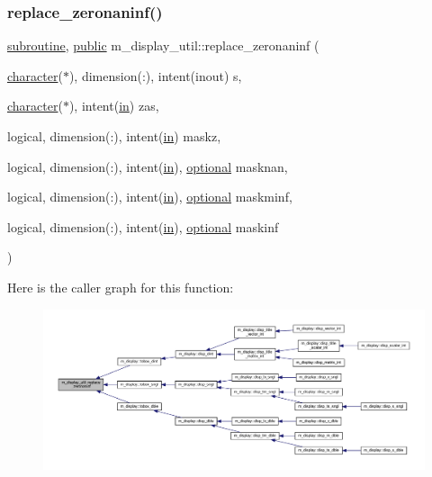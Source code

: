 \subsubsection{\texorpdfstring{replace\+\_\+zeronaninf()}{replace\_zeronaninf()}}
{\footnotesize\ttfamily \hyperlink{M__stopwatch_83_8txt_acfbcff50169d691ff02d4a123ed70482}{subroutine}, \hyperlink{M__stopwatch_83_8txt_a2f74811300c361e53b430611a7d1769f}{public} m\+\_\+display\+\_\+util\+::replace\+\_\+zeronaninf (\begin{DoxyParamCaption}\item[{\hyperlink{option__stopwatch_83_8txt_abd4b21fbbd175834027b5224bfe97e66}{character}($\ast$), dimension(\+:), intent(inout)}]{s,  }\item[{\hyperlink{option__stopwatch_83_8txt_abd4b21fbbd175834027b5224bfe97e66}{character}($\ast$), intent(\hyperlink{M__journal_83_8txt_afce72651d1eed785a2132bee863b2f38}{in})}]{zas,  }\item[{logical, dimension(\+:), intent(\hyperlink{M__journal_83_8txt_afce72651d1eed785a2132bee863b2f38}{in})}]{maskz,  }\item[{logical, dimension(\+:), intent(\hyperlink{M__journal_83_8txt_afce72651d1eed785a2132bee863b2f38}{in}), \hyperlink{option__stopwatch_83_8txt_aa4ece75e7acf58a4843f70fe18c3ade5}{optional}}]{masknan,  }\item[{logical, dimension(\+:), intent(\hyperlink{M__journal_83_8txt_afce72651d1eed785a2132bee863b2f38}{in}), \hyperlink{option__stopwatch_83_8txt_aa4ece75e7acf58a4843f70fe18c3ade5}{optional}}]{maskminf,  }\item[{logical, dimension(\+:), intent(\hyperlink{M__journal_83_8txt_afce72651d1eed785a2132bee863b2f38}{in}), \hyperlink{option__stopwatch_83_8txt_aa4ece75e7acf58a4843f70fe18c3ade5}{optional}}]{maskinf }\end{DoxyParamCaption})}

Here is the caller graph for this function\+:
\nopagebreak
\begin{figure}[H]
\begin{center}
\leavevmode
\includegraphics[width=350pt]{namespacem__display__util_a72816de72f8a35ed93223a4bfd650c9b_icgraph}
\end{center}
\end{figure}
\mbox{\label{namespacem__display__util_a3fa60429ffcc82a33032d718cbe03e87}} 
